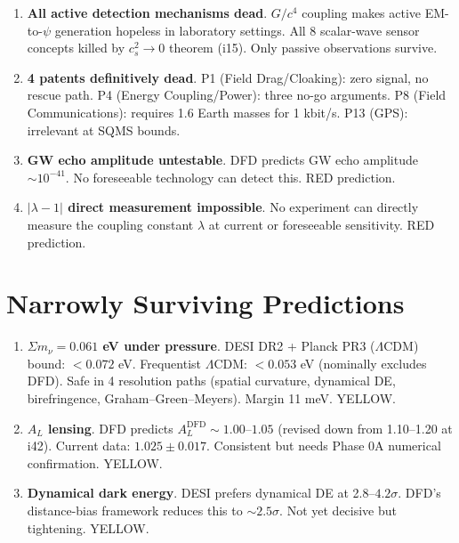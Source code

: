 \documentclass[11pt,a4paper]{article}
\begin{document}
\begin{enumerate}[label=\textbf{N\arabic*.}, leftmargin=2cm]
\item \textbf{All active detection mechanisms dead}. $G/c^4$ coupling makes active EM-to-$\psi$ generation hopeless in laboratory settings. All 8 scalar-wave sensor concepts killed by $c_s^2 \to 0$ theorem (i15). Only passive observations survive.

\item \textbf{4 patents definitively dead}. P1 (Field Drag/Cloaking): zero signal, no rescue path. P4 (Energy Coupling/Power): three no-go arguments. P8 (Field Communications): requires 1.6 Earth masses for 1 kbit/s. P13 (GPS): irrelevant at SQMS bounds.

\item \textbf{GW echo amplitude untestable}. DFD predicts GW echo amplitude $\sim 10^{-41}$. No foreseeable technology can detect this. RED prediction.

\item \textbf{$|\lambda - 1|$ direct measurement impossible}. No experiment can directly measure the coupling constant $\lambda$ at current or foreseeable sensitivity. RED prediction.

\end{enumerate}

\section{Narrowly Surviving Predictions}

\begin{enumerate}[resume, label=\textbf{N\arabic*.}, leftmargin=2cm]

\item \textbf{$\Sigma m_\nu = 0.061$ eV under pressure}. DESI DR2 + Planck PR3 ($\Lambda$CDM) bound: $< 0.072$ eV. Frequentist $\Lambda$CDM: $< 0.053$ eV (nominally excludes DFD). Safe in 4 resolution paths (spatial curvature, dynamical DE, birefringence, Graham--Green--Meyers). Margin 11 meV. YELLOW.

\item \textbf{$A_L$ lensing}. DFD predicts $A_L^\text{DFD} \sim 1.00$--$1.05$ (revised down from 1.10--1.20 at i42). Current data: $1.025 \pm 0.017$. Consistent but needs Phase 0A numerical confirmation. YELLOW.

\item \textbf{Dynamical dark energy}. DESI prefers dynamical DE at 2.8--$4.2\sigma$. DFD's distance-bias framework reduces this to $\sim 2.5\sigma$. Not yet decisive but tightening. YELLOW.

\end{enumerate}
\end{document}
